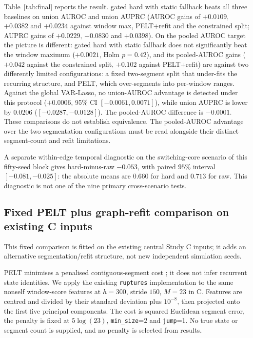 \documentclass[11pt]{article}
\newcommand{\stcg}{gated hard with static fallback}
\begin{document}
Table~\ref{tab:final} reports the result. \stcg{} beats all three baselines on
union AUROC and union AUPRC (AUROC gains of $+0.0109$, $+0.0382$ and $+0.0234$
against window max, PELT+refit and the constrained split; AUPRC gains of
$+0.0229$, $+0.0830$ and $+0.0398$). On the pooled AUROC target the picture is
different: \stcg{} does not significantly beat the window maximum ($+0.0021$,
Holm $p=0.42$), and its pooled-AUROC gains ($+0.042$ against the constrained
split, $+0.102$ against PELT+refit) are against two differently limited
configurations: a fixed two-segment split that under-fits the recurring
structure, and PELT, which over-segments into per-window ranges. Against the
global VAR-Lasso, no union-AUROC advantage is detected under this protocol
($+0.0006$, 95\% CI $[-0.0061,0.0071]$), while union AUPRC is lower by
$0.0206$ ($[-0.0287,-0.0128]$). The pooled-AUROC difference is $-0.0001$.
These comparisons do not establish equivalence. The pooled-AUROC advantage
over the two segmentation configurations must be read alongside their distinct
segment-count and refit limitations.

A separate within-edge temporal diagnostic on the switching-core scenario of
this fifty-seed block gives hard-minus-raw $-0.053$, with paired $95\%$ interval
$[-0.081,-0.025]$: the absolute means are $0.660$ for hard and $0.713$ for raw.
This diagnostic is not one of the nine primary cross-scenario tests.

\begin{table}[!htbp]
\centering
\caption{Auxiliary independent validation on fifty seeds (3000--3049), averaged over
four scenarios within each seed. $\Delta$ is \stcg{} minus the competitor;
intervals are seed-clustered bootstrap 95\%; Holm covers the nine primary tests.}
\label{tab:final}
\resizebox{\linewidth}{!}{}
\end{table}

\subsection{Fixed PELT plus graph-refit comparison on existing C inputs}
This fixed comparison is fitted on the existing central Study C inputs; it
adds an alternative segmentation/refit structure, not new independent simulation seeds.
\label{app:segmentation-validation}

PELT minimises a penalised contiguous-segment cost
\citep{killick2012optimal,ruptures_pelt_docs}; it does not infer recurrent state
identities. We apply the existing \texttt{ruptures} implementation to the
same nonself window-score features at $h=300$, stride $150$, $M=23$ in C.
Features are centred and divided by their standard deviation plus $10^{-8}$,
then projected onto the first five principal components. The cost is squared
Euclidean segment error, the penalty is fixed at $5\log(23)$,
\texttt{min\_size}=2 and \texttt{jump}=1. No true state or segment count is
supplied, and no penalty is selected from results.
\end{document}
